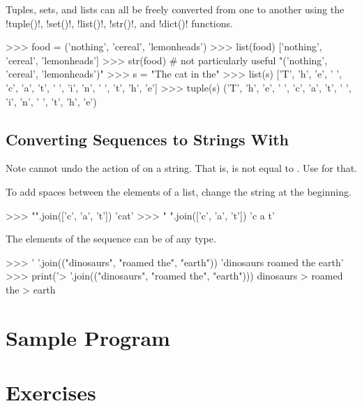 \documentclass[11pt]{cselabheader}
\begin{document}
Tuples, sets, and lists can all be freely converted from one
to another using the \pythoninline!tuple()!, \pythoninline!set()!,
\pythoninline!list()!, \pythoninline!str()!, and \pythoninline!dict()! functions.

\begin{pyconcode}
>>> food = ('nothing', 'cereal', 'lemonheads')
>>> list(food)
['nothing', 'cereal', 'lemonheads']
>>> str(food) # not particularly useful
"('nothing', 'cereal', 'lemonheads')"
>>> s = "The cat in the"
>>> list(s)
['T', 'h', 'e', ' ', 'c', 'a', 't', ' ', 'i', 'n', ' ', 't', 'h', 'e']
>>> tuple(s)
('T', 'h', 'e', ' ', 'c', 'a', 't', ' ', 'i', 'n', ' ', 't', 'h', 'e')

\end{pyconcode}

\subsection{Converting Sequences to Strings With \protect{}}
Note  cannot undo the action of  on
a string. That is,  is not equal to
. Use  for that.

To add spaces between the elements of a list, change the string at the beginning.
\begin{pyconcode}
>>> "".join(['c', 'a', 't'])
'cat'
>>> " ".join(['c', 'a', 't'])
'c a t'

\end{pyconcode}

The elements of the sequence can be of any type.

\begin{pyconcode}
>>> ' '.join(("dinosaurs", "roamed the", "earth"))
'dinosaurs roamed the earth'
>>> print('\n> '.join(("dinosaurs", "roamed the", "earth")))
dinosaurs
> roamed the
> earth

\end{pyconcode}


\section{Sample Program}



\newpage
\section{Exercises}\label{exercises}
\end{document}
